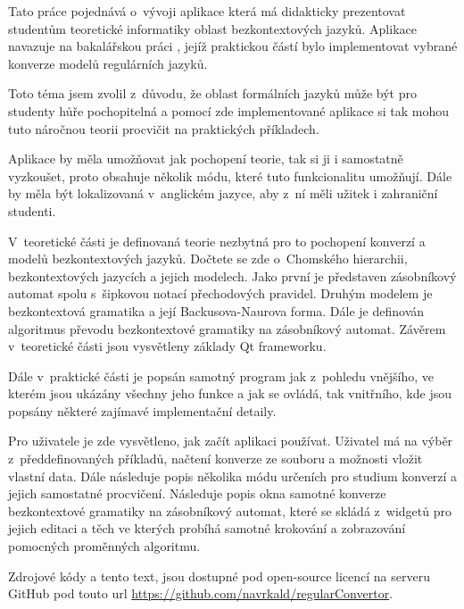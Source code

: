 
Tato práce pojednává o~vývoji aplikace která má didakticky prezentovat studentům teoretické informatiky oblast bezkontextových jazyků. Aplikace navazuje na bakalářskou práci \cite{bakalarka}, jejíž praktickou částí bylo implementovat vybrané konverze modelů regulárních jazyků. 

Toto téma jsem zvolil z~důvodu, že oblast formálních jazyků může být pro studenty hůře pochopitelná a pomocí zde implementované aplikace si tak mohou tuto náročnou teorii procvičit na praktických příkladech.

Aplikace by měla umožňovat jak pochopení teorie, tak si ji i samostatně vyzkoušet, proto obsahuje několik módu, které tuto funkcionalitu umožňují. Dále by měla být lokalizovaná v~anglickém jazyce, aby z~ní měli užitek i zahraniční studenti.

V~teoretické části je definovaná teorie nezbytná pro to pochopení konverzí a modelů bezkontextových jazyků. Dočtete se zde o~Chomského hierarchii, bezkontextových jazycích a jejich modelech. Jako první je představen zásobníkový automat spolu s~šipkovou notací přechodových pravidel. Druhým modelem je bezkontextová gramatika a její Backusova-Naurova forma. Dále je definován algoritmus převodu bezkontextové gramatiky na zásobníkový automat. Závěrem v~teoretické části jsou vysvětleny základy Qt frameworku.

Dále v~praktické části je popsán samotný program jak z~pohledu vnějšího, ve kterém jsou ukázány všechny jeho funkce a jak se ovládá, tak vnitřního, kde jsou popsány některé zajímavé implementační detaily.

Pro uživatele je zde vysvětleno, jak začít aplikaci používat. Uživatel má na výběr z~předdefinovaných příkladů, načtení konverze ze souboru a možnosti vložit vlastní data. Dále následuje popis několika módu určeních pro studium konverzí a jejich samostatné procvičení. Následuje popis okna samotné konverze bezkontextové gramatiky na zásobníkový automat, které se skládá z~widgetů pro jejich editaci a těch ve kterých probíhá samotné krokování a zobrazování pomocných proměnných algoritmu. 

Zdrojové kódy a tento text, jsou dostupné pod open-source licencí na serveru GitHub pod touto url \url{https://github.com/navrkald/regularConvertor}.

